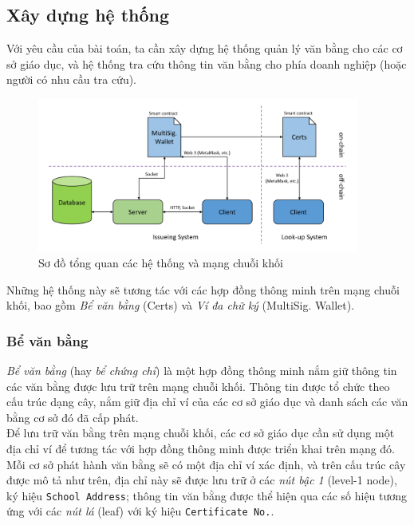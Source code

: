\newpage
\subsection{Xây dựng hệ thống}

Với yêu cầu của bài toán, ta cần xây dựng hệ thống quản lý văn bằng cho các cơ sở giáo dục, và hệ thống tra cứu thông tin văn bằng cho phía doanh nghiệp (hoặc người có nhu cầu tra cứu).\\

\begin{figure}[ht]
    \centering
    \includegraphics[width=400px]{images/system-overview.png}
    \caption{Sơ đồ tổng quan các hệ thống và mạng chuỗi khối}
\end{figure}

Những hệ thống này sẽ tương tác với các hợp đồng thông minh trên mạng chuỗi khối, bao gồm \textit{Bể văn bằng} (Certs) và \textit{Ví đa chữ ký} (MultiSig. Wallet).

\subsubsection{Bể văn bằng}
\textit{Bể văn bằng} (hay \textit{bể chứng chỉ}) là một hợp đồng thông minh nắm giữ thông tin các văn bằng được lưu trữ trên mạng chuỗi khối. Thông tin được tổ chức theo cấu trúc dạng cây, nắm giữ địa chỉ ví của các cơ sở giáo dục và danh sách các văn bằng cơ sở đó đã cấp phát.\\

Để lưu trữ văn bằng trên mạng chuỗi khối, các cơ sở giáo dục cần sử dụng một địa chỉ ví để tương tác với hợp đồng thông minh được triển khai trên mạng đó. Mỗi cơ sở phát hành văn bằng sẽ có một địa chỉ ví xác định, và trên cấu trúc cây được mô tả như trên, địa chỉ này sẽ được lưu trữ ở các \textit{nút bậc 1} (level-1 node), ký hiệu \texttt{School Address}; thông tin văn bằng được thể hiện qua các số hiệu tương ứng với các \textit{nút lá} (leaf) với ký hiệu \texttt{Certificate No.}.\\

